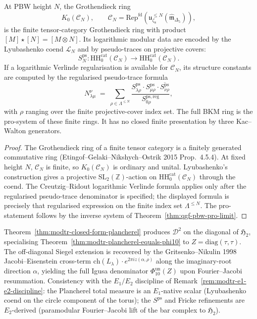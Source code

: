 \begin{theorem}
\label{thm:modtr-log-verlinde}
At PBW height \(N\), the Grothendieck ring
\[
K_0(\mathcal C_N),\qquad
\mathcal C_N=\mathrm{Rep}^{\mathrm{fd}}
(\mathfrak u_{\zeta_8}^{\leq N}(\widehat{\mathfrak m}_{\Delta_5})),
\]
is the finite tensor-category Grothendieck ring with product
\([M]\star[N]=[M\otimes N]\). Its logarithmic modular data are encoded
by the Lyubashenko coend \(\mathcal L_N\) and by pseudo-traces on
projective covers:
\[
 S^{\mathrm{ps}}_{N}\colon
 \mathrm{HH}^{\mathrm{cat}}_0(\mathcal C_N)
 \longrightarrow
 \mathrm{HH}^{\mathrm{cat}}_0(\mathcal C_N).
\]
If a logarithmic Verlinde regularisation is available for
\(\mathcal C_N\), its structure constants are computed by the
regularised pseudo-trace formula
 \[
 N_{\lambda\mu}^\nu
 \;=\;
 \sum_{\rho\in\Lambda^{\leq N}}
 \frac{S^{\mathrm{ps}}_{\lambda\rho}\cdot
 S^{\mathrm{ps}}_{\mu\rho}\cdot
 \overline{S^{\mathrm{ps}}_{\nu\rho}}}
 {S^{\mathrm{ps,reg}}_{0\rho}},
 \]
with \(\rho\) ranging over the finite projective-cover index set. The
full BKM ring is the pro-system of these finite rings. It has no
closed finite presentation by three Kac--Walton generators.
\end{theorem}

\begin{proof}
The Grothendieck ring of a finite tensor category is a finitely
generated commutative ring
(Etingof--Gelaki--Nikshych--Ostrik 2015 Prop.~4.5.4). At fixed
height \(N\), \(\mathcal C_N\) is finite, so \(K_0(\mathcal C_N)\) is
ordinary and unital. Lyubashenko's construction gives a projective
\(\mathrm{SL}_2(\mathbb Z)\)-action on
\(\mathrm{HH}^{\mathrm{cat}}_0(\mathcal C_N)\) through the coend. The
Creutzig--Ridout logarithmic Verlinde formula applies only after the
regularised pseudo-trace denominator is specified; the displayed formula
is precisely that regularised expression on the finite index set
\(\Lambda^{\leq N}\). The pro-statement follows by the inverse system
of Theorem~\ref{thm:qgf-pbw-pro-limit}.
\end{proof}

\begin{remark}
\label{rem:modtr-closed-form-cross-channel}
Theorem~\ref{thm:modtr-closed-form-plancherel} produces $\mathcal D^2$
on the diagonal of $\mathfrak H_2$, specialising
Theorem~\ref{thm:modtr-plancherel-equals-phi10} to $Z =
\mathrm{diag}(\tau,\tau)$. The off-diagonal Siegel extension is
recovered by the Gritsenko--Nikulin 1998 Jacobi--Eisenstein cross-term
$\mathrm{ch}(L_\lambda)\cdot e^{2\pi i z(\alpha,\rho)}$ along the
imaginary-root direction $\alpha$, yielding the full Igusa denominator
$\Phi_{10}^{\mathrm{un}}(Z)$ upon Fourier--Jacobi resummation. Consistency with the
$E_1/E_2$ discipline of
Remark~\ref{rem:modtr-e1-e2-discipline}: the Plancherel total measure
is an $E_1$-native scalar (Lyubashenko coend on the circle component
of the torus); the $S^{\mathrm{ps}}$ and Fricke refinements are
$E_2$-derived (paramodular Fourier--Jacobi lift of the bar complex to
$\mathfrak H_2$).
\end{remark}
